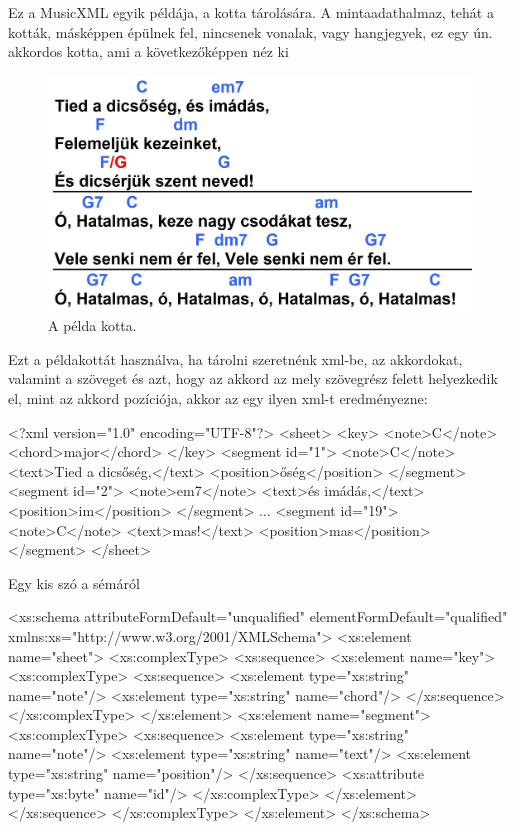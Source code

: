 Ez a MusicXML egyik példája, a kotta tárolására. A mintaadathalmaz, tehát a kották, másképpen épülnek fel, nincsenek vonalak, vagy hangjegyek, ez egy ún. akkordos kotta, ami a következőképpen néz ki
\newpage
{}
\begin{figure}[h]
	\includegraphics[scale=0.3]{images/samples/Tied_a_dicsoseg.jpg}
	\caption{A példa kotta.}
	\label{fig:song1}
\end{figure}

Ezt a példakottát használva, ha tárolni szeretnénk xml-be, az akkordokat, valamint a szöveget és azt, hogy az akkord az mely szövegrész felett helyezkedik el, mint az akkord pozíciója, akkor az egy ilyen xml-t eredményezne:

\begin{xml}
<?xml version="1.0" encoding="UTF-8"?>
<sheet>
   <key>
      <note>C</note>
      <chord>major</chord>
   </key>
   <segment id="1">
      <note>C</note>
      <text>Tied a dicsőség,</text>
      <position>őség</position>
   </segment>
   <segment id="2">
      <note>em7</note>
      <text>és imádás,\n</text>
      <position>im</position>
   </segment>
   ...
   <segment id="19">
      <note>C</note>
      <text>mas!</text>
      <position>mas</position>
   </segment>
</sheet>
\end{xml}

Egy kis szó a sémáról

\begin{xml}
<xs:schema attributeFormDefault="unqualified" elementFormDefault="qualified" xmlns:xs="http://www.w3.org/2001/XMLSchema">
  <xs:element name="sheet">
    <xs:complexType>
      <xs:sequence>
        <xs:element name="key">
          <xs:complexType>
            <xs:sequence>
              <xs:element type="xs:string" name="note"/>
              <xs:element type="xs:string" name="chord"/>
            </xs:sequence>
          </xs:complexType>
        </xs:element>
        <xs:element name="segment">
          <xs:complexType>
            <xs:sequence>
              <xs:element type="xs:string" name="note"/>
              <xs:element type="xs:string" name="text"/>
              <xs:element type="xs:string" name="position"/>
            </xs:sequence>
            <xs:attribute type="xs:byte" name="id"/>
          </xs:complexType>
        </xs:element>
      </xs:sequence>
    </xs:complexType>
  </xs:element>
</xs:schema>
\end{xml}

